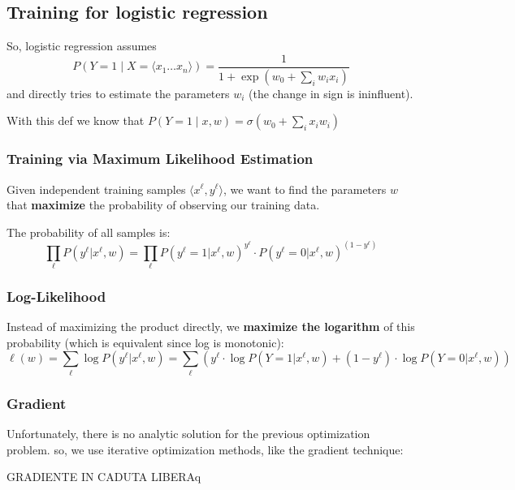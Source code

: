 \subsection{Training for logistic regression}
So, logistic regression assumes
\[
 P(Y=1\mid X =\langle x_1 \dots x_n\rangle) =\frac{1}{1+\exp{(w_0+\sum_iw_ix_i)}}
\]
and directly tries to estimate the parameters $w_i$ (the change in sign
is ininfluent).


With this def we know that $P(Y=1\mid x, w) = \sigma (w_0 + \sum_{i}x_iw_i)$

\subsubsection{Training via Maximum Likelihood Estimation}

Given independent training samples $\langle x^\ell, y^\ell \rangle$, we want to find the parameters $w$ that \textbf{maximize} the probability of observing our training data.

The probability of all samples is:
\[
\prod_\ell P(y^\ell | x^\ell, w) = \prod_\ell P(y^\ell = 1|x^\ell, w)^{y^\ell} \cdot P(y^\ell = 0|x^\ell, w)^{(1-y^\ell)}
\]


\subsubsection{Log-Likelihood}

Instead of maximizing the product directly, we \textbf{maximize the logarithm} of this probability (which is equivalent since log is monotonic):
\[
\ell(w) = \sum_\ell \log P(y^\ell | x^\ell, w) = \sum_\ell \left( y^\ell \cdot \log P(Y=1|x^\ell, w) + (1-y^\ell) \cdot \log P(Y=0|x^\ell, w) \right)
\]

\subsubsection{Gradient}

Unfortunately, there is no analytic solution for the previous
optimization problem.
so, we use iterative optimization methods, like the gradient
technique:

GRADIENTE IN CADUTA LIBERAq